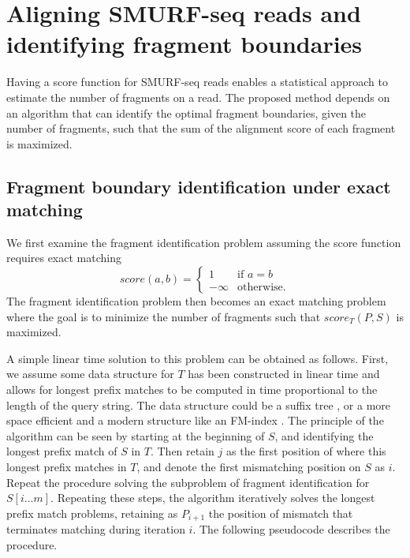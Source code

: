 \section{Aligning SMURF-seq reads and identifying fragment boundaries}

Having a score function for SMURF-seq reads enables a statistical
approach to estimate the number of fragments on a read. The proposed
method depends on an algorithm that can identify the optimal fragment
boundaries, given the number of fragments, such that the sum of the
alignment score of each fragment is maximized.

\subsection{Fragment boundary identification under exact matching}
We first examine the fragment identification problem assuming the score
function requires exact matching
\[score(a,b)=
\begin{cases}
  1 & \text{if } a = b \\
  -\infty & \text{otherwise.}
\end{cases}\]
The fragment identification problem then becomes an exact matching
problem where the goal is to minimize the number of fragments such that
$score_T(P,S)$ is maximized.

A simple linear time solution to this problem can be obtained as
follows. First, we assume some data structure for $T$ has been
constructed in linear time and allows for longest prefix matches to be
computed in time proportional to the length of the query string. The
data structure could be a suffix tree \citep{mccreight1976space}, or a
more space efficient and a modern structure like an FM-index
\citep{ferragina2000opportunistic}. The principle of the algorithm can be
seen by starting at the beginning of $S$, and identifying the longest
prefix match of $S$ in $T$. Then retain $j$ as the first position of
where this longest prefix matches in $T$, and denote the first
mismatching position on $S$ as $i$. Repeat the procedure solving the
subproblem of fragment identification for $S[i\dots m]$. Repeating these
steps, the algorithm iteratively solves the longest prefix match
problems, retaining as $P_{i+1}$ the position of mismatch that
terminates matching during iteration $i$. The following pseudocode
describes the procedure.

